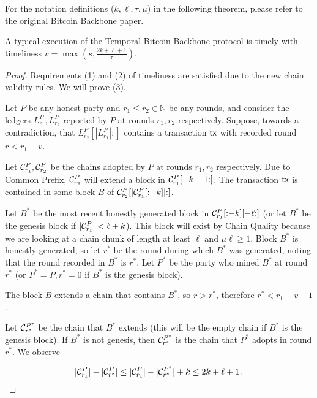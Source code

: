 For the notation definitions ($k, \ell, \tau, \mu$)
in the following theorem, please refer to the original Bitcoin
Backbone paper.

\begin{theorem}
  A typical execution of the Temporal Bitcoin Backbone protocol is timely
  with timeliness $v = \max(s, \frac{2k + \ell + 1}{\tau})$.
\end{theorem}
\begin{proof}
  Requirements (1) and (2) of timeliness are satisfied due to the new chain validity rules.
  We will prove (3).

  Let $P$ be any honest party and $r_1 \leq r_2 \in \mathbb{N}$ be any rounds, and consider
  the ledgers $L^P_{r_1}, L^P_{r_2}$ reported by $P$ at rounds $r_1, r_2$ respectively.
  Suppose, towards a contradiction, that $L^P_{r_2}[|L^P_{r_1}|{:}]$ contains a transaction
  $\textsf{tx}$ with recorded round $r < r_1 - v$.

  Let $\mathcal{C}^P_{r_1}, \mathcal{C}^P_{r_2}$ be the chains adopted by $P$ at rounds $r_1, r_2$ respectively.
  Due to Common Prefix, $\mathcal{C}^P_{r_2}$ will extend a block in $\mathcal{C}^P_{r_1}[{-k-1}{:}]$.
  The transaction $\textsf{tx}$ is contained in some block $B$ of $\mathcal{C}^P_{r_2}[{|\mathcal{C}^P_{r_1}[{:}{-k}]|}{:}]$.

  Let $B^*$ be the most recent
  honestly generated block in $\mathcal{C}^P_{r_1}[{:}{-k}][-\ell{:}]$
  (or let $B^*$ be the genesis block if $|\mathcal{C}^P_{r_1}| < \ell + k$).
  This block will exist by
  Chain Quality because we are looking at a chain chunk of length at least $\ell$ and
  $\mu\ell \geq 1$.
  Block $B^*$ is honestly generated, so let $r^*$ be the round
  during which $B^*$ was generated, noting that the round recorded in $B^*$ is $r^*$.
  Let $P^*$ be the party who mined $B^*$ at round $r^*$ (or $P^* = P, r^* = 0$ if $B^*$ is
  the genesis block).

  The block $B$ extends a chain that contains $B^*$, so $r > r^*$,
  therefore $r^* < r_1 - v - 1$.

  Let $\mathcal{C}^{P^*}_{r^*}$ be the chain that $B^*$ extends (this will be the empty chain if
  $B^*$ is the genesis block). If $B^*$ is not genesis, then $\mathcal{C}^{P^*}_{r^*}$ is the chain
  that $P^*$ adopts in round $r^*$. We observe

  \[
     |\chain^P_{r_1}| - |\chain^P_{r^*}| \leq
     |\chain^P_{r_1}| - |\chain^{P^*}_{r^*}| + k \leq %
     2k + \ell + 1\,. %
  \]


\end{proof}
